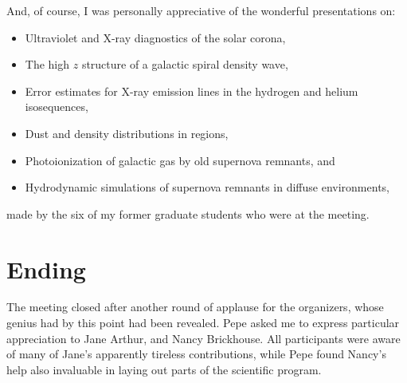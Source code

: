 \documentclass[proceedings]{rmaa}
\begin{document}
And, of course, I was personally appreciative of the wonderful 
presentations on:
\begin{itemize}
     \item  Ultraviolet and X-ray diagnostics of the solar corona,
     \item  The high $z$ structure of a galactic spiral density wave, 
     \item  Error estimates for X-ray emission lines in the hydrogen and 
helium isosequences,
     \item  Dust and density distributions in  regions,
     \item  Photoionization of galactic gas by old supernova remnants, and
     \item  Hydrodynamic simulations of supernova remnants in diffuse 
environments,
\end{itemize}
made by the six of my former graduate students who were at the meeting.
\vspace*{-0.5ex}
\enlargethispage{2ex}
\section{Ending}
\vspace*{-0.5ex}

The meeting closed after another round of applause for the organizers, 
whose genius had by this point had been revealed.  Pepe asked me to 
express particular appreciation to Jane Arthur, and Nancy Brickhouse.  
All participants were aware of many of Jane's apparently tireless 
contributions, while Pepe found Nancy's help also invaluable in laying 
out parts of the scientific program.

\outputfulladdresses
\end{document}

